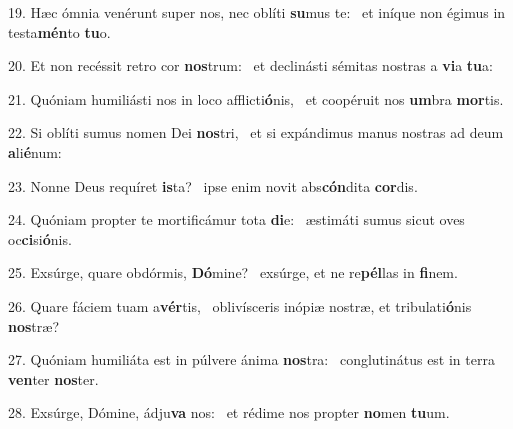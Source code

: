 19. Hæc ómnia venérunt super nos, nec oblíti \textbf{su}mus te: \ast\  et iníque non égimus in testa\textbf{mén}to \textbf{tu}o.\

20. Et non recéssit retro cor \textbf{nos}trum: \ast\  et declinásti sémitas nostras a \textbf{vi}a \textbf{tu}a:\

21. Quóniam humiliásti nos in loco afflicti\textbf{ó}nis, \ast\  et coopéruit nos \textbf{um}bra \textbf{mor}tis.\

22. Si oblíti sumus nomen Dei \textbf{nos}tri, \ast\  et si expándimus manus nostras ad deum \textbf{a}li\textbf{é}num:\

23. Nonne Deus requíret \textbf{is}ta? \ast\  ipse enim novit abs\textbf{cón}dita \textbf{cor}dis.\

24. Quóniam propter te mortificámur tota \textbf{di}e: \ast\  æstimáti sumus sicut oves oc\textbf{ci}si\textbf{ó}nis.\

25. Exsúrge, quare obdórmis, \textbf{Dó}mine? \ast\  exsúrge, et ne re\textbf{pél}las in \textbf{fi}nem.\

26. Quare fáciem tuam a\textbf{vér}tis, \ast\  oblivísceris inópiæ nostræ, et tribulati\textbf{ó}nis \textbf{nos}træ?\

27. Quóniam humiliáta est in púlvere ánima \textbf{nos}tra: \ast\  conglutinátus est in terra \textbf{ven}ter \textbf{nos}ter.\

28. Exsúrge, Dómine, ádju\textbf{va} nos: \ast\  et rédime nos propter \textbf{no}men \textbf{tu}um.\

